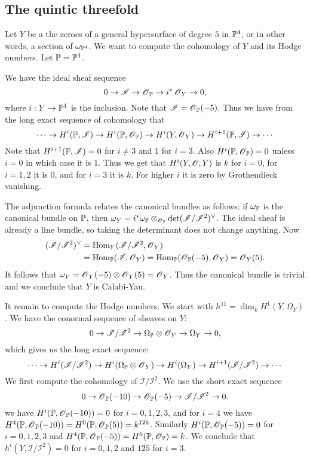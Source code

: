 \documentclass[11pt, english]{article}
\begin{document}
\subsection{The quintic threefold}

Let $Y$ be a the zeroes of a general hypersurface of degree $5$ in $\mathbb{P}^4$, or in other words, a section of $\omega_{\mathbb{P}^4}$. We want to compute the cohomology of $Y$ and its Hodge numbers. Let $\mathbb{P} = \mathbb{P}^4$.

We have the ideal sheaf sequence
$$
0 \to \mathscr I \to \operatorname{\mathscr{O}}_{\mathbb{P}} \to i^\ast \operatorname{\mathscr{O}}_Y \to 0,
$$
where $i:Y \to \mathbb{P}^4$ is the inclusion. Note that $\mathscr I = \operatorname{\mathscr{O}}_{\mathbb{P}}(-5)$. Thus we have from the long exact sequence of cohomology that
$$
\cdots \to H^i(\mathbb{P}, \mathscr I) \to H^i(\mathbb{P},\operatorname{\mathscr{O}}_{\mathbb{P}}) \to H^i(Y,\operatorname{\mathscr{O}}_Y) \to H^{i+1}(\mathbb{P},\mathscr I) \to \cdots
$$
Note that $H^{i+1}(\mathbb{P},\mathscr I) = 0$ for $i \neq 3$ and $1$ for $i=3$. Also $H^i(\mathbb{P},\operatorname{\mathscr{O}}_{\mathbb{P}})=0$ unless $i=0$ in which case it is $1$. Thus we get that $H^i(Y,\operatorname{\mathscr{O}},Y)$ is $k$ for $i=0$, for $i=1,2$ it is $0$, and for $i=3$ it is $k$. For higher $i$ it is zero by Grothendieck vanishing.

The adjunction formula relates the canonical bundles as follows: if $\omega_{\mathbb{P}}$ is the canonical bundle on $\mathbb{P}$, then $\omega_Y = i^\ast \omega_{\mathbb{P}} \otimes_{\operatorname{\mathscr{O}}_{\mathbb{P}}} \det(\mathscr I/\mathscr I^2)^\vee$. The ideal sheaf is already a line bundle, so taking the determinant does not change anything. Now
\begin{align*}
(\mathscr I/\mathscr I^2)^\vee &= \operatorname{Hom}_Y(\mathscr I/\mathscr I^2,\operatorname{\mathscr{O}}_Y) \\
&= \operatorname{Hom}_{\mathbb{P}}(\mathscr I,\operatorname{\mathscr{O}}_Y)=\operatorname{Hom}_{\mathbb{P}}(\operatorname{\mathscr{O}}_{\mathbb{P}}(-5),\operatorname{\mathscr{O}}_Y)=\operatorname{\mathscr{O}}_Y(5).
\end{align*}
It follows that $\omega_Y = \operatorname{\mathscr{O}}_Y(-5) \otimes \operatorname{\mathscr{O}}_Y(5)=\operatorname{\mathscr{O}}_Y$. Thus the canonical bundle is trivial and we conclude that $Y$ is Calabi-Yau.

It remain to compute the Hodge numbers. We start with $h^{11} = \dim_k H^1(Y,\Omega_Y)$. We have the conormal sequence of sheaves on $Y$:
$$
0 \to \mathscr I / \mathscr I^2 \to \Omega_{\mathbb{P}} \otimes \operatorname{\mathscr{O}}_Y \to \Omega_Y \to 0,
$$
which gives us the long exact sequence:
$$
\cdots \to H^i(\mathscr I/\mathscr I^2) \to H^i(\Omega_{\mathbb{P}} \otimes \operatorname{\mathscr{O}}_Y) \to H^i(\Omega_Y) \to H^{i+1}(\mathscr I/\mathscr I^2) \to \cdots 
$$
We first compute the cohomology of $\mathscr I/\mathscr I^2$. We use the short exact sequence
\begin{equation}
\label{normaleq}
0 \to \operatorname{\mathscr{O}}_{\mathbb{P}}(-10) \to \operatorname{\mathscr{O}}_{\mathbb{P}}(-5) \to \mathscr I / \mathscr I^2 \to 0.
\end{equation}
we have $H^i(\mathbb{P},\operatorname{\mathscr{O}}_{\mathbb{P}}(-10))=0$ for $i=0,1,2,3$, and for $i=4$ we have $H^4(\mathbb{P},\operatorname{\mathscr{O}}_{\mathbb{P}}(-10))=H^0(\mathbb{P},\operatorname{\mathscr{O}}_{\mathbb{P}}(5))=k^{126}$. Similarly $H^i(\mathbb{P},\operatorname{\mathscr{O}}_{\mathbb{P}}(-5))=0$ for $i=0,1,2,3$ and $H^4(\mathbb{P},\operatorname{\mathscr{O}}_{\mathbb{P}}(-5))=H^0(\mathbb{P},\operatorname{\mathscr{O}}_{\mathbb{P}})=k$. We conclude that $h^i(Y,\mathscr I/\mathscr I^2) = 0$ for $i=0,1,2$ and $125$ for $i=3$.
\end{document}
